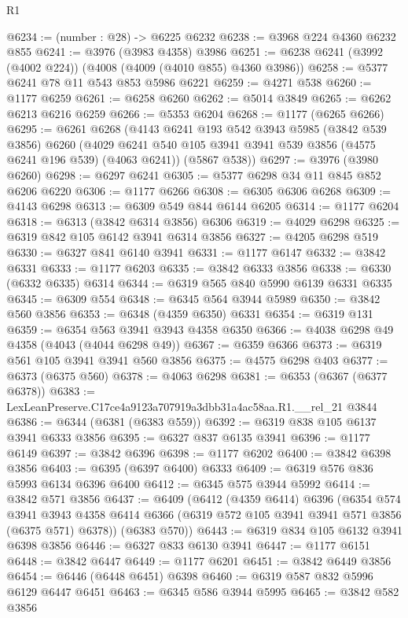 \begin{lexlean}{R1}
\begin{coremodule}
@6234 := (number : @28) -> @6225 @6232
@6238 := @3968 @224 @4360 @6232 @855
@6241 := @3976 (@3983 @4358) @3986
@6251 := @6238 @6241 (@3992 (@4002 @224)) (@4008 (@4009 (@4010 @855) @4360 @3986))
@6258 := @5377 @6241 @78 @11 @543 @853 @5986 @6221
@6259 := @4271 @538
@6260 := @1177 @6259
@6261 := @6258 @6260
@6262 := @5014 @3849
@6265 := @6262 @6213 @6216 @6259
@6266 := @5353 @6204
@6268 := @1177 (@6265 @6266)
@6295 := @6261
    @6268
    (@4143
      @6241
      @193
      @542
      @3943
      @5985
      (@3842 @539 @3856)
      @6260
      (@4029 @6241 @540 @105 @3941 @3941 @539 @3856 (@4575 @6241 @196 @539) (@4063 @6241))
      (@5867 @538))
@6297 := @3976 (@3980 @6260)
@6298 := @6297 @6241
@6305 := @5377 @6298 @34 @11 @845 @852 @6206 @6220
@6306 := @1177 @6266
@6308 := @6305 @6306 @6268
@6309 := @4143 @6298
@6313 := @6309 @549 @844 @6144 @6205
@6314 := @1177 @6204
@6318 := @6313 (@3842 @6314 @3856) @6306
@6319 := @4029 @6298
@6325 := @6319 @842 @105 @6142 @3941 @6314 @3856
@6327 := @4205 @6298 @519
@6330 := @6327 @841 @6140 @3941
@6331 := @1177 @6147
@6332 := @3842 @6331
@6333 := @1177 @6203
@6335 := @3842 @6333 @3856
@6338 := @6330 (@6332 @6335) @6314
@6344 := @6319 @565 @840 @5990 @6139 @6331 @6335
@6345 := @6309 @554
@6348 := @6345 @564 @3944 @5989
@6350 := @3842 @560 @3856
@6353 := @6348 (@4359 @6350) @6331
@6354 := @6319 @131
@6359 := @6354 @563 @3941 @3943 @4358 @6350
@6366 := @4038 @6298 @49 @4358 (@4043 (@4044 @6298 @49))
@6367 := @6359 @6366
@6373 := @6319 @561 @105 @3941 @3941 @560 @3856
@6375 := @4575 @6298 @403
@6377 := @6373 (@6375 @560)
@6378 := @4063 @6298
@6381 := @6353 (@6367 (@6377 @6378))
@6383 := LexLeanPreserve.C17ce4a9123a707919a3dbb31a4ac58aa.R1.__rel_21 @3844
@6386 := @6344 (@6381 (@6383 @559))
@6392 := @6319 @838 @105 @6137 @3941 @6333 @3856
@6395 := @6327 @837 @6135 @3941
@6396 := @1177 @6149
@6397 := @3842 @6396
@6398 := @1177 @6202
@6400 := @3842 @6398 @3856
@6403 := @6395 (@6397 @6400) @6333
@6409 := @6319 @576 @836 @5993 @6134 @6396 @6400
@6412 := @6345 @575 @3944 @5992
@6414 := @3842 @571 @3856
@6437 := @6409
    (@6412
      (@4359 @6414)
      @6396
      (@6354
        @574
        @3941
        @3943
        @4358
        @6414
        @6366
        (@6319 @572 @105 @3941 @3941 @571 @3856 (@6375 @571) @6378))
      (@6383 @570))
@6443 := @6319 @834 @105 @6132 @3941 @6398 @3856
@6446 := @6327 @833 @6130 @3941
@6447 := @1177 @6151
@6448 := @3842 @6447
@6449 := @1177 @6201
@6451 := @3842 @6449 @3856
@6454 := @6446 (@6448 @6451) @6398
@6460 := @6319 @587 @832 @5996 @6129 @6447 @6451
@6463 := @6345 @586 @3944 @5995
@6465 := @3842 @582 @3856

\end{coremodule}
\end{lexlean}
